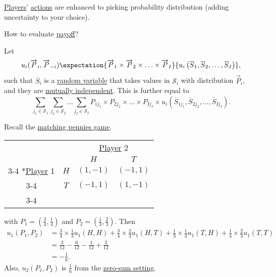 \hyperref[def:player]{Players}' \hyperref[def:strategy]{actions} are enhanced to picking probability distribution (adding uncertainty to your choice).

\begin{problem}
How to evaluate \hyperref[def:reward]{payoff}?
\end{problem}
\begin{answer}
	Let
	\[
		u_{i}(\overrightarrow{P}_i, \overrightarrow{P}_{-i})
		\expectation{\overrightarrow{P}_{1}\times \overrightarrow{P}_2 \times \ldots \times \overrightarrow{P}_I}{u_{i}\left(\overline{S}_1, \overline{S}_2, \ldots , \overline{S}_I\right)},
	\]
	such that \(\overline{S}_i\) is a \hyperref[def:random-variable]{random variable} that takes values in \(\mathcal{S}_i\) with
	distribution \(\overrightarrow{P}_i\), and they are \hyperref[def:independent]{mutually independent}. This is further equal to
	\[
		\sum\limits_{j_1\in \mathcal{S}_1 }\sum\limits_{j_2\in \mathcal{S}_2}\ldots \sum\limits_{j_I\in \mathcal{S}_I }P_{1j_1}\times P_{2j_2}\times \ldots \times P_{Ij_I}\times u_{i}\left(\overline{S}_{1j_1}, \overline{S}_{2j_2}, \ldots , \overline{S}_{Ij_I}\right).
	\]
\end{answer}

\begin{eg}
	Recall the \hyperref[eg:matching-pennies]{matching pennies game}.
	\begin{table}[H]
		\centering
		\setlength{\extrarowheight}{2pt}
		\begin{tabular}{cc|c|c|}
			                                               & \multicolumn{1}{c}{} & \multicolumn{2}{c}{\hyperref[def:player]{Player} 2}                           \\
			                                               & \multicolumn{1}{c}{} & \multicolumn{1}{c}{$H$}                             & \multicolumn{1}{c}{$T$} \\\cline{3-4}
			\multirow{2}*{\hyperref[def:player]{Player} 1} & $H$                  & $(1, -1)$                                           & $(-1, 1)$               \\\cline{3-4}
			                                               & $T$                  & $(-1, 1)$                                           & $(1, -1)$               \\\cline{3-4}
		\end{tabular}
	\end{table}
	with \(P_1 = (\frac{3}{4}, \frac{1}{4})\) and \(P_2 = (\frac{1}{3}, \frac{2}{3})\). Then
	\[
		\begin{split}
			u_1(P_1, P_2) &= \frac{3}{4}\times \frac{1}{3} u_1(H, H) + \frac{3}{4}\times \frac{2}{3}u_1(H, T) + \frac{1}{3}\times \frac{1}{3}u_1(T, H)+\frac{1}{4}\times \frac{2}{3}u_1(T, T)\\
			&= \frac{3}{12} - \frac{6}{12} - \frac{1}{12} + \frac{2}{12}\\
			&= -\frac{1}{6}.
		\end{split}
	\]
	Also, \(u_2(P_1, P_2)\) is \(\frac{1}{6}\) from the \hyperref[def:zero-sum-game]{zero-sum setting}.
\end{eg}

